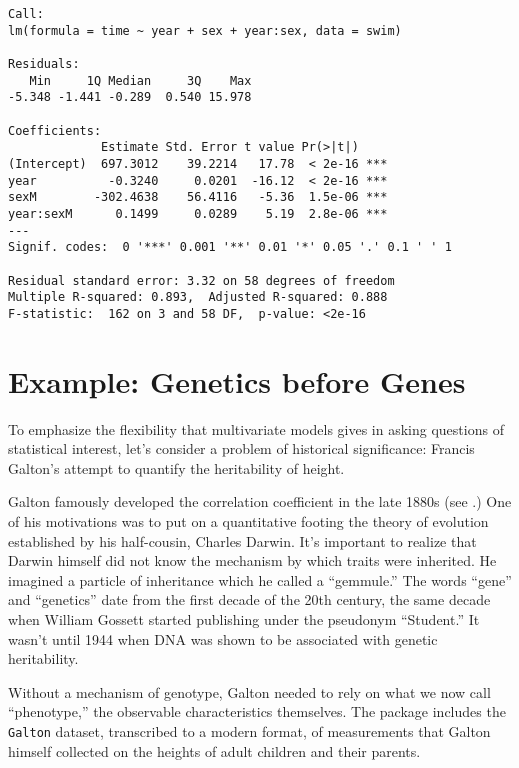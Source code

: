 \begin{itemize}
\begin{knitrout}
{\begin{kframe}
\begin{verbatim}
Call:
lm(formula = time ~ year + sex + year:sex, data = swim)

Residuals:
   Min     1Q Median     3Q    Max 
-5.348 -1.441 -0.289  0.540 15.978 

Coefficients:
             Estimate Std. Error t value Pr(>|t|)    
(Intercept)  697.3012    39.2214   17.78  < 2e-16 ***
year          -0.3240     0.0201  -16.12  < 2e-16 ***
sexM        -302.4638    56.4116   -5.36  1.5e-06 ***
year:sexM      0.1499     0.0289    5.19  2.8e-06 ***
---
Signif. codes:  0 '***' 0.001 '**' 0.01 '*' 0.05 '.' 0.1 ' ' 1 

Residual standard error: 3.32 on 58 degrees of freedom
Multiple R-squared: 0.893,	Adjusted R-squared: 0.888 
F-statistic:  162 on 3 and 58 DF,  p-value: <2e-16 

\end{verbatim}
\end{kframe}}
\end{knitrout}


\end{itemize}


\section{Example: Genetics before Genes}

To emphasize the flexibility that multivariate models gives in asking
questions of statistical interest, let's consider a problem of
historical significance: Francis Galton's attempt to quantify the heritability
of height.

Galton famously developed the correlation coefficient in the late
1880s (see \cite{galton-co-relations}.)  One of his motivations was to
put on a quantitative footing the theory of evolution established
by his half-cousin, Charles Darwin.  It's important to realize that
Darwin himself did not know the mechanism by which traits were
inherited.  He imagined a particle of inheritance which he called a
``gemmule.''  The words ``gene'' and ``genetics'' date from the first
decade of the 20th century, the same decade when William Gossett started
publishing under the pseudonym ``Student.''  It wasn't until 1944 when
DNA was shown to be associated with genetic heritability.

Without a mechanism of genotype, Galton needed to rely on what we now
call ``phenotype,'' the observable characteristics themselves.  The 
 package
includes the 
\texttt{Galton} dataset, transcribed to a modern format, of measurements that Galton himself
collected on the heights of adult children and their parents. 



